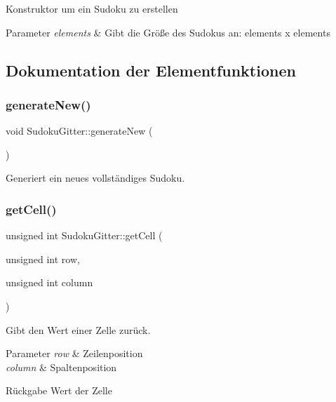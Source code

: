 Konstruktor um ein Sudoku zu erstellen 
\begin{DoxyParams}{Parameter}
{\em elements} & Gibt die Größe des Sudokus an\+: elements x elements \\
\hline
\end{DoxyParams}


\subsection{Dokumentation der Elementfunktionen}
\mbox{\label{class_sudoku_gitter_a1cd2a95fea6f56d295fcc4bb11412c2e}} 
\subsubsection{\texorpdfstring{generate\+New()}{generateNew()}}
{\footnotesize\ttfamily void Sudoku\+Gitter\+::generate\+New (\begin{DoxyParamCaption}{ }\end{DoxyParamCaption})}

Generiert ein neues vollständiges Sudoku. \mbox{\label{class_sudoku_gitter_a588e1738f938570014ab104a834f9a89}} 
\subsubsection{\texorpdfstring{get\+Cell()}{getCell()}}
{\footnotesize\ttfamily unsigned int Sudoku\+Gitter\+::get\+Cell (\begin{DoxyParamCaption}\item[{unsigned int}]{row,  }\item[{unsigned int}]{column }\end{DoxyParamCaption})}

Gibt den Wert einer Zelle zurück. 
\begin{DoxyParams}{Parameter}
{\em row} & Zeilenposition \\
\hline
{\em column} & Spaltenposition \\
\hline
\end{DoxyParams}
\begin{DoxyReturn}{Rückgabe}
Wert der Zelle 
\end{DoxyReturn}
\mbox{\label{class_sudoku_gitter_a771332a8a5eff5e1917538adfb237d0e}} 
